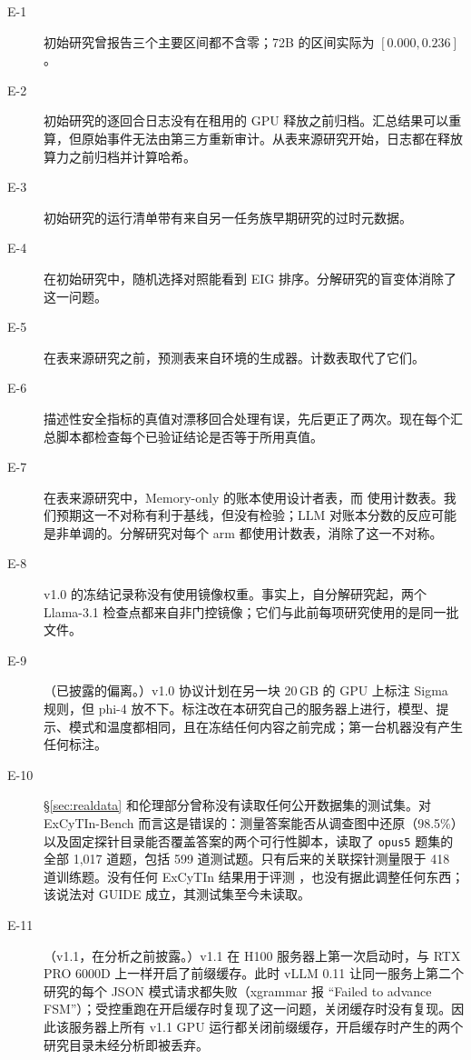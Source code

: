 \begin{description}
  \item[E-1] 初始研究曾报告三个主要区间都不含零；72B 的区间实际为 $[0.000, 0.236]$。
  \item[E-2] 初始研究的逐回合日志没有在租用的 GPU 释放之前归档。汇总结果可以重算，但原始事件无法由第三方重新审计。从表来源研究开始，日志都在释放算力之前归档并计算哈希。
  \item[E-3] 初始研究的运行清单带有来自另一任务族早期研究的过时元数据。
  \item[E-4] 在初始研究中，随机选择对照能看到 EIG 排序。分解研究的盲变体消除了这一问题。
  \item[E-5] 在表来源研究之前，预测表来自环境的生成器。计数表取代了它们。
  \item[E-6] 描述性安全指标的真值对漂移回合处理有误，先后更正了两次。现在每个汇总脚本都检查每个已验证结论是否等于所用真值。
  \item[E-7] 在表来源研究中，Memory-only 的账本使用设计者表，而 \hesp{} 使用计数表。我们预期这一不对称有利于基线，但没有检验；LLM 对账本分数的反应可能是非单调的。分解研究对每个 arm 都使用计数表，消除了这一不对称。
  \item[E-8] v1.0 的冻结记录称没有使用镜像权重。事实上，自分解研究起，两个 Llama-3.1 检查点都来自非门控镜像；它们与此前每项研究使用的是同一批文件。
  \item[E-9]（已披露的偏离。）v1.0 协议计划在另一块 20\,GB 的 GPU 上标注 Sigma 规则，但 phi-4 放不下。标注改在本研究自己的服务器上进行，模型、提示、模式和温度都相同，且在冻结任何内容之前完成；第一台机器没有产生任何标注。
  \item[E-10] \S\ref{sec:realdata} 和伦理部分曾称没有读取任何公开数据集的测试集。对 ExCyTIn-Bench 而言这是错误的：测量答案能否从调查图中还原（98.5\%）以及固定探针目录能否覆盖答案的两个可行性脚本，读取了 \texttt{opus5} 题集的全部 1{,}017 道题，包括 599 道测试题。只有后来的关联探针测量限于 418 道训练题。没有任何 ExCyTIn 结果用于评测 \hesp{}，也没有据此调整任何东西；该说法对 GUIDE 成立，其测试集至今未读取。
  \item[E-11]（v1.1，在分析之前披露。）v1.1 在 H100 服务器上第一次启动时，与 RTX PRO 6000D 上一样开启了前缀缓存。此时 vLLM 0.11 让同一服务上第二个研究的每个 JSON 模式请求都失败（xgrammar 报 “Failed to advance FSM”）；受控重跑在开启缓存时复现了这一问题，关闭缓存时没有复现。因此该服务器上所有 v1.1 GPU 运行都关闭前缀缓存，开启缓存时产生的两个研究目录未经分析即被丢弃。
\end{description}
